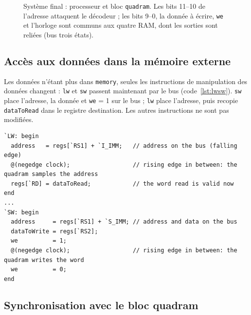 \begin{figure}[H]
\caption[Système final : processeur et bloc quadram]{Système final : processeur et bloc \texttt{quadram}. Les bits 11--10 de l'adresse
attaquent le décodeur ; les bits 9--0, la donnée à écrire, \texttt{we} et l'horloge sont communs
aux quatre RAM, dont les sorties sont reliées (bus trois états).}
\label{fig:systeme}
\end{figure}

\subsection{Accès aux données dans la mémoire externe}
\label{sec:lwsw}

Les données n'étant plus dans \texttt{memory}, seules les instructions de manipulation des
données changent : \texttt{lw} et \texttt{sw} passent maintenant par le bus
(code~\ref{lst:lwsw}). \texttt{sw} place l'adresse, la donnée et \texttt{we} = 1 sur le bus ;
\texttt{lw} place l'adresse, puis recopie \texttt{dataToRead} dans le registre destination. Les
autres instructions ne sont pas modifiées.

\noindent\begin{minipage}{\linewidth}
\begin{lstlisting}[style=verilog, caption={Instructions \texttt{lw} et \texttt{sw} reliées au bloc \texttt{quadram}}, label={lst:lwsw}]
`LW: begin
  address   = regs[`RS1] + `I_IMM;   // address on the bus (falling edge)
  @(negedge clock);                  // rising edge in between: the quadram samples the address
  regs[`RD] = dataToRead;            // the word read is valid now
end
...
`SW: begin
  address     = regs[`RS1] + `S_IMM; // address and data on the bus
  dataToWrite = regs[`RS2];
  we          = 1;
  @(negedge clock);                  // rising edge in between: the quadram writes the word
  we          = 0;
end
\end{lstlisting}
\end{minipage}\par

\subsection{Synchronisation avec le bloc quadram}
\label{sec:synchro}

